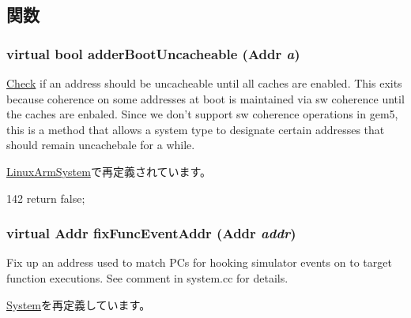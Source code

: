 \subsection{関数}
\hypertarget{classArmSystem_aa3d376f8ebebf8bc40b44b3ef359cf3d}{
\subsubsection[{adderBootUncacheable}]{\setlength{\rightskip}{0pt plus 5cm}virtual bool adderBootUncacheable ({\bf Addr} {\em a})}}
\label{classArmSystem_aa3d376f8ebebf8bc40b44b3ef359cf3d}
\hyperlink{classCheck}{Check} if an address should be uncacheable until all caches are enabled. This exits because coherence on some addresses at boot is maintained via sw coherence until the caches are enbaled. Since we don't support sw coherence operations in gem5, this is a method that allows a system type to designate certain addresses that should remain uncachebale for a while. 

\hyperlink{classLinuxArmSystem_ac081da131af9bc2b37f4c4d7d99eaff1}{LinuxArmSystem}で再定義されています。


\begin{DoxyCode}
142 { return false; }
\end{DoxyCode}
\hypertarget{classArmSystem_aff94f650c5eef23b8dc350ea755bdef4}{
\subsubsection[{fixFuncEventAddr}]{\setlength{\rightskip}{0pt plus 5cm}virtual {\bf Addr} fixFuncEventAddr ({\bf Addr} {\em addr})}}
\label{classArmSystem_aff94f650c5eef23b8dc350ea755bdef4}
Fix up an address used to match PCs for hooking simulator events on to target function executions. See comment in system.cc for details. 

\hyperlink{classSystem_aff94f650c5eef23b8dc350ea755bdef4}{System}を再定義しています。


